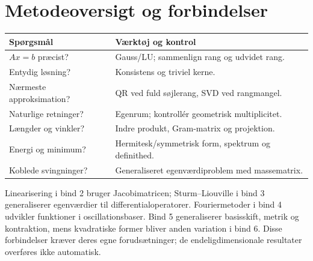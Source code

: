 \section{Metodeoversigt og forbindelser}
\label{sec:la-metode}
\begin{center}
\begin{tabular}{@{}p{}p{}@{}}
\toprule
Spørgsmål & Værktøj og kontrol\\\midrule
$Ax=b$ præcist? & Gauss/LU; sammenlign rang og udvidet rang.\\
Entydig løsning? & Konsistens og triviel kerne.\\
Nærmeste approksimation? & QR ved fuld søjlerang, SVD ved rangmangel.\\
Naturlige retninger? & Egenrum; kontrollér geometrisk multiplicitet.\\
Længder og vinkler? & Indre produkt, Gram-matrix og projektion.\\
Energi og minimum? & Hermitesk/symmetrisk form, spektrum og definithed.\\
Koblede svingninger? & Generaliseret egenværdiproblem med massematrix.\\\bottomrule
\end{tabular}
\end{center}
Linearisering i bind 2 bruger Jacobimatricen; Sturm--Liouville i bind 3
generaliserer egenværdier til differentialoperatorer. Fouriermetoder i
bind 4 udvikler funktioner i oscillationsbaser. Bind 5 generaliserer
basisskift, metrik og kontraktion, mens kvadratiske former bliver anden
variation i bind 6. Disse forbindelser kræver deres egne forudsætninger;
de endeligdimensionale resultater overføres ikke automatisk.
